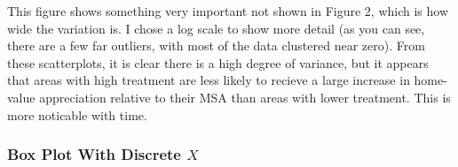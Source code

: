 \documentclass[11pt]{article}
\begin{document}
    This figure shows something very important not shown in Figure 2, which
is how wide the variation is. I chose a log scale to show more detail
(as you can see, there are a few far outliers, with most of the data
clustered near zero). From these scatterplots, it is clear there is a high degree of variance, but it appears that areas with high treatment are less likely to recieve a large increase in home-value appreciation relative to their MSA than areas with lower treatment. This is more noticable with time.

    \subsubsection{\texorpdfstring{Box Plot With Discrete
\(X\)}{Box Plot With Discrete X}}\label{box-plot-with-discrete-x}
\end{document}
